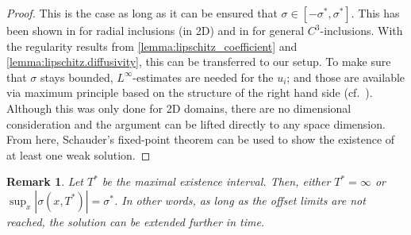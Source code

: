 \documentclass[reqno, 11pt]{amsart}
\newtheorem{rem}[thm]{Remark}
\numberwithin{equation}{section}
\begin{document}
\begin{proof}
This is the case as long as it can be ensured that $\sigma\in[-\sigma^*,\sigma^*]$.
This has been shown in \cite{EdenNikolopoulosMuntean22} for radial inclusions (in 2D) and in \cite{EdenMuntean2024} for general $C^3$-inclusions.
With the regularity results from \cref{lemma:lipschitz_coefficient} and \cref{lemma:lipschitz.diffusivity}, this can be transferred to our setup.
To make sure that $\sigma$ stays bounded, $L^\infty$-estimates are needed for the $u_i$; and those are available via maximum principle based on the structure of the right hand side (cf.~\cite[Lemma 8]{EdenNikolopoulosMuntean22}).
Although this was only done for 2D domains, there are no dimensional consideration and the argument can be lifted directly to any space dimension.
From here, Schauder's fixed-point theorem can be used to show the existence of at least one weak solution.
\end{proof}

\begin{rem}
    Let $T^*$ be the maximal existence interval. Then, either $T^*= \infty$ or $\sup_{x}|\sigma(x,T^*)|=\sigma^*$.
    In other words, as long as the offset limits are not reached, the solution can be extended further in time.
\end{rem}
\end{document}
